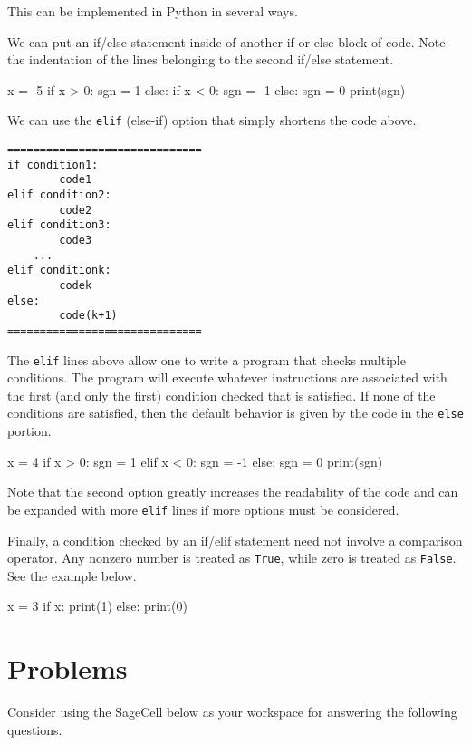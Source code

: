 \documentclass{ximera}
\begin{document}
This can be implemented in Python in several ways.

We can put an if/else statement inside of another if or else block of code. Note the indentation of the lines belonging to the second if/else statement.

\begin{sageCell}
x = -5
if x > 0:
	sgn = 1
else:
	if x < 0:
		sgn = -1
	else:
		sgn = 0
print(sgn)
\end{sageCell}
	
We can use the \verb|elif| (else-if) option that simply shortens the code above.

\begin{verbatim}
==============================
if condition1:
        code1
elif condition2:
        code2
elif condition3:
        code3
    ...
elif conditionk:
        codek
else:
        code(k+1)
==============================
\end{verbatim}

The \verb|elif| lines above allow one to write a program that checks multiple conditions. The program will execute whatever instructions are associated with the first (and only the first) condition checked that is satisfied. If none of the conditions are satisfied, then the default behavior is given by the code in the \verb|else| portion.

\begin{sageCell}
x = 4
if x > 0:
        sgn = 1
elif x < 0:
        sgn = -1
else:
        sgn = 0
print(sgn)
\end{sageCell}

Note that the second option greatly increases the readability of the code and can be expanded with more \verb|elif| lines if more options must be considered.

Finally, a condition checked by an if/elif statement need not involve a comparison operator. Any nonzero number is treated as \verb|True|, while zero is treated as \verb|False|. See the example below.

\begin{sageCell}
x = 3
if x:
       print(1)
else:
       print(0)
\end{sageCell}

\section{Problems}

Consider using the SageCell below as your workspace for answering the following questions.
\end{document}
